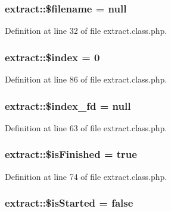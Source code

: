 \subsubsection[{\$filename}]{\setlength{\rightskip}{0pt plus 5cm}extract\+::\$filename = null}\label{classextract_abec232df6889e57dd327ddf132799f4c}


Definition at line 32 of file extract.\+class.\+php.

\hypertarget{classextract_a167ca671b16d1b95eef76886f6d91a0c}{}
\subsubsection[{\$index}]{\setlength{\rightskip}{0pt plus 5cm}extract\+::\$index = 0}\label{classextract_a167ca671b16d1b95eef76886f6d91a0c}


Definition at line 86 of file extract.\+class.\+php.

\hypertarget{classextract_a6805ee81f498cae226d90b8fa9ecba88}{}
\subsubsection[{\$index\+\_\+fd}]{\setlength{\rightskip}{0pt plus 5cm}extract\+::\$index\+\_\+fd = null}\label{classextract_a6805ee81f498cae226d90b8fa9ecba88}


Definition at line 63 of file extract.\+class.\+php.

\hypertarget{classextract_a0962c888279f7c5d551d3fdf1af1ee4c}{}
\subsubsection[{\$is\+Finished}]{\setlength{\rightskip}{0pt plus 5cm}extract\+::\$is\+Finished = true}\label{classextract_a0962c888279f7c5d551d3fdf1af1ee4c}


Definition at line 74 of file extract.\+class.\+php.

\hypertarget{classextract_a609fc88642ae3bf1e27f0232f1b21171}{}
\subsubsection[{\$is\+Started}]{\setlength{\rightskip}{0pt plus 5cm}extract\+::\$is\+Started = false}\label{classextract_a609fc88642ae3bf1e27f0232f1b21171}


